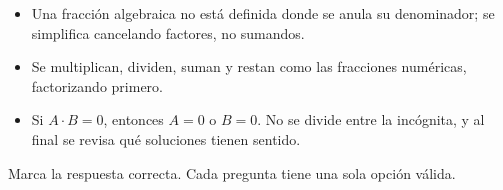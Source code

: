 \documentclass[11pt]{article}
\begin{document}
\begin{resumen}
\begin{itemize}
  \item Una fracción algebraica no está definida donde se anula su
        denominador; se simplifica cancelando factores, no sumandos.
  \item Se multiplican, dividen, suman y restan como las fracciones
        numéricas, factorizando primero.
  \item Si $A \cdot B = 0$, entonces $A = 0$ o $B = 0$. No se divide entre
        la incógnita, y al final se revisa qué soluciones tienen sentido.
\end{itemize}
\end{resumen}


Marca la respuesta correcta. Cada pregunta tiene una sola opción válida.
\end{document}
